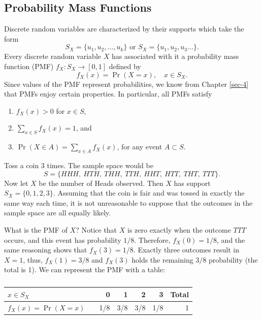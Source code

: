 \documentclass[captions=tableheading]{scrbook}
\begin{document}
\subsection{Probability Mass Functions}
\label{sec-5-1-1}
\label{sub-probability-mass-functions}


Discrete random variables are characterized by their supports which take the form
\begin{equation}
S_{X}=\{u_{1},u_{2},\ldots,u_{k}\}\mbox{ or }S_{X}=\{u_{1},u_{2},u_{3}\ldots\}.
\end{equation}
Every discrete random variable \(X\) has associated with it a probability mass function (PMF) \(f_{X}:S_{X}\to[0,1]\) defined by
\begin{equation}
f_{X}(x)=\Pr(X=x),\quad x\in S_{X}.
\end{equation}
Since values of the PMF represent probabilities, we know from Chapter \ref{sec-4} that PMFs enjoy certain properties. In particular, all PMFs satisfy
\begin{enumerate}
\item \(f_{X}(x)>0\) for \(x\in S\),
\item \(\sum_{x\in S}f_{X}(x)=1\), and
\item \(\Pr(X\in A)=\sum_{x\in A}f_{X}(x)\), for any event \(A\subset S\).
\end{enumerate}

\begin{example}

Toss a coin 3 times. The sample space would be
\[
S=\{ HHH,\ HTH,\ THH,\ TTH,\ HHT,\ HTT,\ THT,\ TTT\}.
\]
Now let \(X\) be the number of Heads observed. Then \(X\) has support \(S_{X}=\{ 0,1,2,3\} \). Assuming that the coin is fair and was tossed in exactly the same way each time, it is not unreasonable to suppose that the outcomes in the sample space are all equally likely. 

What is the PMF of \(X\)? Notice that \(X\) is zero exactly when the outcome \(TTT\) occurs, and this event has probability \(1/8\). Therefore, \(f_{X}(0)=1/8\), and the same reasoning shows that \(f_{X}(3)=1/8\). Exactly three outcomes result in \(X=1\), thus, \(f_{X}(1)=3/8\) and \(f_{X}(3)\) holds the remaining \(3/8\) probability (the total is 1). We can represent the PMF with a table:
\begin{table}[htb]
\caption{} \label{exa-Toss-a-coin}
\begin{center}
\begin{tabular}{llrrrrr}
 \(x\in S_{X}\)         &     &    0  &    1  &    2  &    3  &  Total  \\
\hline
 \(f_{X}(x)=\Pr(X=x)\)  &     &  1/8  &  3/8  &  3/8  &  1/8  &      1  \\
\end{tabular}
\end{center}
\end{table}

\end{example}
\end{document}
